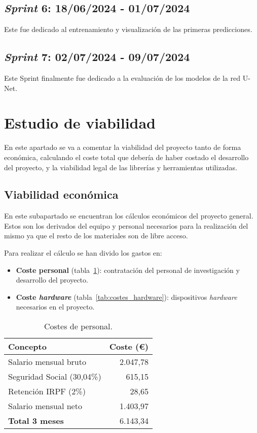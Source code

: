 \subsection{\textit{Sprint} 6: 18/06/2024 - 01/07/2024}
Este fue dedicado al entrenamiento y visualización de las primeras predicciones.

\subsection{\textit{Sprint} 7: 02/07/2024 - 09/07/2024}
Este Sprint finalmente fue dedicado a la evaluación de los modelos de la red U-Net.

\section{Estudio de viabilidad}

En este apartado se va a comentar la viabilidad del proyecto tanto de forma económica, calculando el coste total que debería de haber costado el desarrollo del proyecto, y la viabilidad legal de las librerías y herramientas utilizadas.

\subsection{Viabilidad económica}

En este subapartado se encuentran los cálculos económicos del proyecto general.
Estos son los derivados del equipo y personal necesarios para la realización del mismo ya que el resto de los materiales son de libre acceso.

Para realizar el cálculo se han divido los gastos en:
\begin{itemize}
	\item \textbf{Coste personal} (tabla~\ref{tab:costes_personal}): contratación del personal de investigación y desarrollo del proyecto.
	\item \textbf{Coste \textit{hardware}} (tabla~\ref{tab:costes_hardware}): dispositivos \textit{hardware} necesarios en el proyecto.
\end{itemize}

\begin{table}\centering
	\begin{tabular}[]{@{}l r@{}}
		\toprule
		\textbf{Concepto} & \textbf{Coste (\euro{})} \\
		\midrule
		Salario mensual bruto & 2.047,78 \\
		Seguridad Social (30,04\%) & 615,15 \\
		Retención IRPF (2\%) & 28,65 \\
		Salario mensual neto & 1.403,97 \\\hubu
		\textbf{Total 3 meses } &  6.143,34 \\
		\bottomrule
	\end{tabular}
	\caption{Costes de personal.}
	\label{tab:costes_personal}
\end{table}

